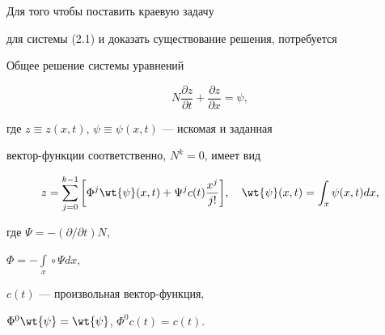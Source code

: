 Для того чтобы поставить краевую задачу


для системы (2.1) и доказать существование решения, потребуется 





\begin{lems}


Общее решение системы уравнений


\begin{equation}


N\frac{\partial z}{\partial t}+\frac{\partial z}{\partial x}=\psi ,


\end{equation}


где $z\equiv z(x,t)$, $\psi \equiv \psi (x,t)$ --- искомая и заданная


вектор-функции соответственно, $N^k=0$, имеет вид


\begin{equation}


z=\sum_{j=0}^{k-1}\bigg[\Phi^{j}\wt {\psi }(x,t)+


\Psi ^{j}c(t)\frac{x^{j}}{j!}\bigg],\quad


\wt {\psi }(x,t)=\int_x\psi (x,t)dx,


\end{equation}


где $\Psi =-(\partial/\partial t)N$,


$\Phi =-\int\limits_x\circ\Psi dx$,


$c(t)$ --- произвольная вектор-функция,


$\Phi ^0\wt {\psi } =\wt {\psi }$, $\Phi ^0c(t)=c(t)$.


\end{lems}





